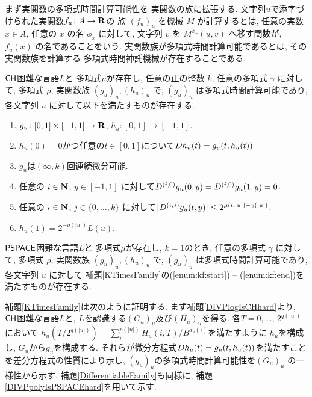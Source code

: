 まず実関数の多項式時間計算可能性を
実関数の族に拡張する.
文字列$u$で添字づけられた実関数$f _u \colon A \to \mathbf R$の
族 $(f_u)_u$ を機械 $M$ が計算するとは,
任意の実数 $x \in A$, 任意の $x$ の名 $\phi_x$ に対して,
文字列 $v$ を $M ^{\phi _x} (u, v)$ へ移す関数が, 
$f _u (x)$ の名であることをいう.
実関数族が多項式時間計算可能であるとは, その実関数族を計算する
多項式時間神託機械が存在することである.

 \begin{lemma}
  \label{KTimesFamily}
  $\mathsf{CH}$困難な言語$L$と
  多項式$\mu$が存在し,
  任意の正の整数 $k$,
  任意の多項式 $\gamma$ に対して,
  多項式 $\rho$, 実関数族 $(g_u)_u, (h_u)_u$ で, 
  $(g_u)_u$ は多項式時間計算可能であり,
  各文字列 $u$ に対して以下を満たすものが存在する.
  \begin{enumerate}
   \item \label{enum:kf:start}
     $g_u\colon [0,1] \times [-1,1]\to \mathbf R$, $h_u\colon [0,1] \to [-1,1]$. 
   \item \label{enum:equation}
	 $h_u(0) = 0$かつ任意の$t \in [0,1]$について$D h_u(t) = g_u(t, h_u(t))$
   \item \label{enum:differentiability}
         $g_u$は$(\infty, k)$回連続微分可能.
   \item \label{enum:boundary}
	 任意の $i \in \mathbf N$, $y \in [-1,1]$ に対して$
	  D^{(i, 0)} g_u(0,y) = D^{(i, 0)} g_u(1,y) = 0
         $.
   \item \label{enum:smooth}
	 任意の $i \in \mathbf N$, $j \in \{0, \dots, k\}$ に対して$
	  \left|D^{(i,j)} g_u(t,y)\right| \le 2^{\mu(i, |u|) - \gamma(|u|)}
         $.
   \item \label{enum:kf:end}
	 $h_u(1) = 2^{-\rho(|u|)} L(u)$.
  \end{enumerate}
 \end{lemma}

\begin{lemma}
 \label{DifferentiableFamily}
 $\mathsf{PSPACE}$困難な言語$L$と
 多項式$\mu$が存在し, 
 $k = 1$のとき,
 任意の多項式 $\gamma$ に対して,
 多項式 $\rho$, 実関数族 $(g_u)_u, (h_u)_u$ で, 
 $(g_u)_u$ は多項式時間計算可能であり,
 各文字列 $u$ に対して
 補題\ref{KTimesFamily}の(\ref{enum:kf:start}) -- (\ref{enum:kf:end})を満たすものが存在する.
\end{lemma}

補題\ref{KTimesFamily}は次のように証明する.
まず補題\ref{DIVPlogIsCHhard}より, 
$\mathsf{CH}$困難な言語$L$と, 
$L$を認識する$(G_u)_u$及び$(H_u)_u$を得る.
各$T = 0$, \ldots, $2^{q(|u|)}$において
$h_u(T/2^{q(|u|)}) = \sum^{p(|u|)}_{i}H_u(i, T)/B^{d_u(i)}$を満たすように
$h_u$を構成し, $G_u$から$g_u$を構成する.
 それらが微分方程式$D h_u(t) = g_u(t, h_u(t))$を満たすことを差分方程式の性質により示し,
 $(g_u)_u$の多項式時間計算可能性を$(G_u)_u$ の一様性から示す.
補題\ref{DifferentiableFamily}も同様に, 
補題\ref{DIVPpolyIsPSPACEhard}を用いて示す. 

